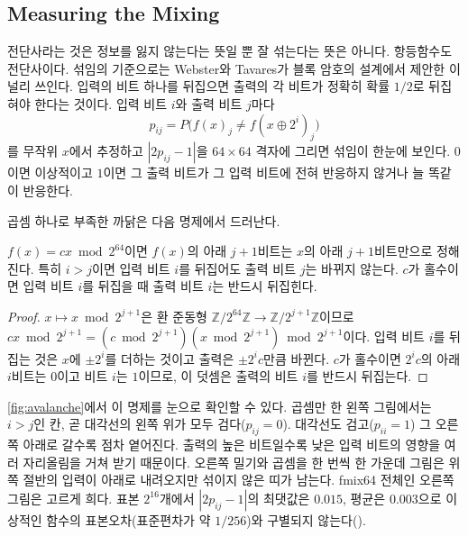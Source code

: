\subsection{Measuring the Mixing}

전단사라는 것은 정보를 잃지 않는다는 뜻일 뿐 잘 섞는다는 뜻은 아니다. 항등함수도 전단사이다. 섞임의 기준으로는 Webster와 Tavares가 블록 암호의 설계에서 제안한 이 널리 쓰인다\cite{webster1985sbox}. 입력의 비트 하나를 뒤집으면 출력의 각 비트가 정확히 확률 $1/2$로 뒤집혀야 한다는 것이다. 입력 비트 $i$와 출력 비트 $j$마다
\[
p_{ij}=P\bigl(f(x)_j\neq f(x\oplus2^i)_j\bigr)
\]
를 무작위 $x$에서 추정하고 $|2p_{ij}-1|$을 $64\times64$ 격자에 그리면 섞임이 한눈에 보인다. $0$이면 이상적이고 $1$이면 그 출력 비트가 그 입력 비트에 전혀 반응하지 않거나 늘 똑같이 반응한다.

곱셈 하나로 부족한 까닭은 다음 명제에서 드러난다.

\begin{proposition}
\label{prop:mul-low-bits}
$f(x)=cx\bmod2^{64}$이면 $f(x)$의 아래 $j+1$비트는 $x$의 아래 $j+1$비트만으로 정해진다. 특히 $i>j$이면 입력 비트 $i$를 뒤집어도 출력 비트 $j$는 바뀌지 않는다. $c$가 홀수이면 입력 비트 $i$를 뒤집을 때 출력 비트 $i$는 반드시 뒤집힌다.
\end{proposition}

\begin{proof}
$x\mapsto x\bmod2^{j+1}$은 환 준동형 $\mathbb{Z}/2^{64}\mathbb{Z}\to\mathbb{Z}/2^{j+1}\mathbb{Z}$이므로 $cx\bmod2^{j+1}=(c\bmod2^{j+1})(x\bmod2^{j+1})\bmod2^{j+1}$이다. 입력 비트 $i$를 뒤집는 것은 $x$에 $\pm2^i$를 더하는 것이고 출력은 $\pm2^ic$만큼 바뀐다. $c$가 홀수이면 $2^ic$의 아래 $i$비트는 $0$이고 비트 $i$는 $1$이므로, 이 덧셈은 출력의 비트 $i$를 반드시 뒤집는다.
\end{proof}

\cref{fig:avalanche}에서 이 명제를 눈으로 확인할 수 있다. 곱셈만 한 왼쪽 그림에서는 $i>j$인 칸, 곧 대각선의 왼쪽 위가 모두 검다($p_{ij}=0$). 대각선도 검고($p_{ii}=1$) 그 오른쪽 아래로 갈수록 점차 옅어진다. 출력의 높은 비트일수록 낮은 입력 비트의 영향을 여러 자리올림을 거쳐 받기 때문이다. 오른쪽 밀기와 곱셈을 한 번씩 한 가운데 그림은 위쪽 절반의 입력이 아래로 내려오지만 섞이지 않은 띠가 남는다. fmix64 전체인 오른쪽 그림은 고르게 희다. 표본 $2^{16}$개에서 $|2p_{ij}-1|$의 최댓값은 $0.015$, 평균은 $0.003$으로 이상적인 함수의 표본오차(표준편차가 약 $1/256$)와 구별되지 않는다().

